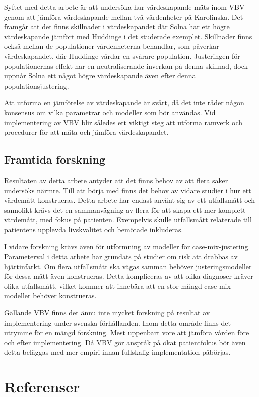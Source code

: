 Syftet med detta arbete är att undersöka hur värdeskapande mäts inom VBV genom att jämföra värdeskapande mellan två vårdenheter på Karolinska. Det framgår att det finns skillnader i värdeskapandet där Solna har ett högre värdeskapande jämfört med Huddinge i det studerade exemplet. Skillnader finns också mellan de populationer vårdenheterna behandlar, som påverkar värdeskapandet, där Huddinge vårdar en svårare population. Justeringen för populationernas effekt har en neutraliserande inverkan på denna skillnad, dock uppnår Solna ett något högre värdeskapande även efter denna populationsjustering.

Att utforma en jämförelse av värdeskapande är svårt, då det inte råder någon konsensus om vilka parametrar och modeller som bör användas. Vid implementering av VBV blir således ett viktigt steg att utforma ramverk och procedurer för att mäta och jämföra värdeskapandet. 

\subsection{Framtida forskning}

Resultaten av detta arbete antyder att det finns behov av att flera saker undersöks närmre. Till att börja med finns det behov av vidare studier i hur ett värdemått konstrueras. Detta arbete har endast använt sig av ett utfallsmått och sannolikt krävs det en sammanvägning av flera för att skapa ett mer komplett värdemått, med fokus på patienten. Exempelvis skulle utfallsmått relaterade till patientens upplevda livskvalitet och bemötade inkluderas.

I vidare forskning krävs även för utformning av modeller för case-mix-justering. Parameterval i detta arbete har grundats på studier om risk att drabbas av hjärtinfarkt. Om flera utfallsmått ska vägas samman behöver justeringsmodeller för dessa mått även konstrueras. Detta kompliceras av att olika diagnoser kräver olika utfallsmått, vilket kommer att innebära att en stor mängd case-mix-modeller behöver konstrueras.

Gällande VBV finns det ännu inte mycket forskning på resultat av implementering under svenska förhållanden. Inom detta område finns det utrymme för en mängd forskning. Mest uppenbart vore att jämföra vården före och efter implementering. Då VBV gör anspråk på ökat patientfokus bör även detta beläggas med mer empiri innan fullskalig implementation påbörjas.

\section{Referenser}
\setlength{\parindent}{0cm}

